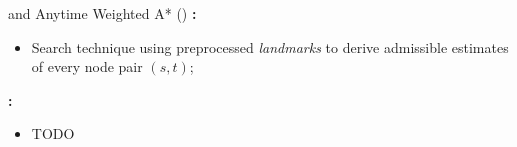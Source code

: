 \begin{frame}{\ALT{} and Anytime Weighted A* (\AWA{})}
    \textbf{\ALT{}:}
    \begin{itemize}
        \item Search technique using preprocessed \textit{landmarks} to derive admissible
            estimates of every node pair $(s, t)$;
    \end{itemize}
    \textbf{\AWA{}:}
    \begin{itemize}
        \item TODO
    \end{itemize}
\end{frame}
